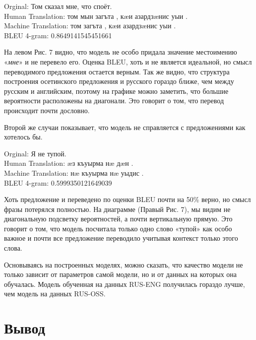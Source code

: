 \documentclass[a4paper,12pt]{article}
\begin{document}
	\begin{table}[h]
	\footnotesize {
    	{Orginal}:  Том сказал мне, что споёт. \\
        {Human Translation}: том мын загъта , кæи азардзæнис уыи . \\
        {Machine Translation}: том загъта , кæи азардзæнис уыи . \\
        {BLEU 4-gram}: 0.8649141545451661
    }
    \end{table}
    
    На левом Рис. 7 видно, что модель не особо придала значение местоимению «\textit{мне}» и не перевело его. Оценка BLEU, хоть и не является идеальной, но смысл переводимого предложения остается верным. Так же видно, что структура построения осетинского предложения и русского гораздо ближе, чем между русским и английским, поэтому на графике можно заметить, что большие вероятности расположены на диагонали. Это говорит о том, что перевод происходит почти дословно. 
    
    Второй же случаи показывает, что модель не справляется с предложениями как хотелось бы.
    
    \begin{table}[h]
	\footnotesize {
    	{Orginal}:  Я не тупой. \\
        {Human Translation}: æз къуырма нæ дæн . \\
        {Machine Translation}: нæ къуырма нæ уыдис . \\
        {BLEU 4-gram}: 0.5999350121649039
    }
    \end{table}
    
    Хоть предложение и переведено по оценки BLEU почти на 50\% верно, но смысл фразы потерялся полностью. На диаграмме (Правый Рис. 7), мы видим не диагональную подсветку вероятностей, а почти вертикальную прямую. Это говорит о том, что модель посчитала только одно слово «тупой» как особо важное и почти все предложение переводило учитывая контекст только этого слова.
    
    Основываясь на построенных моделях, можно сказать, что качество модели не только зависит от параметров самой модели, но и от данных на которых она обучалась. Модель обученная на данных RUS-ENG получилась гораздо лучше, чем модель на данных RUS-OSS.
    
    
    \section*{Вывод}
    
\end{document}
